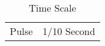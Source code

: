 \begin{table}
\begin{tabular}{ll} 
	Pulse      & 1/10 Second	\\
	\end{tabular}
	\caption{Time Scale}	
\end{table}

